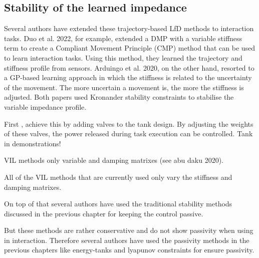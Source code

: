 



\subsection{Stability of the learned impedance}

Several authors have extended these trajectory-based LfD methods to interaction tasks. Duo et al. 2022, for example, \cite{douRobotSkillLearning2022} extended a DMP with a variable stiffness term to create a Compliant Movement Principle (CMP) method that can be used to learn interaction tasks. Using this method, they learned the trajectory and stiffness profile from sensors. Arduingo et al. 2020, on the other hand, resorted to a GP-based learning approach in which the stiffness is related to the uncertainty of the movement. The more uncertain a movement is, the more the stiffness is adjusted. Both papers used Kronander stability constraints to stabilise the variable impedance profile.

First \cite{shahriariAdaptingContactsEnergy2017}, achieve this by adding valves to the tank design. By adjusting the weights of these valves, the power released during task execution can be controlled. Tank in demonstrations!

VIL methods only variable and damping matrixes (see abu daku 2020).

All of the VIL methods that are currently used only vary the stiffness and damping matrixes.

On top of that several authors have used the traditional stability methods discussed in the previous chapter for keeping the control passive.

But these methods are rather conservative and do not show passivity when using in interaction. Therefore several authors have used the passivity methods in the previous chapters like energy-tanks and lyapunov constraints for ensure passivity.

